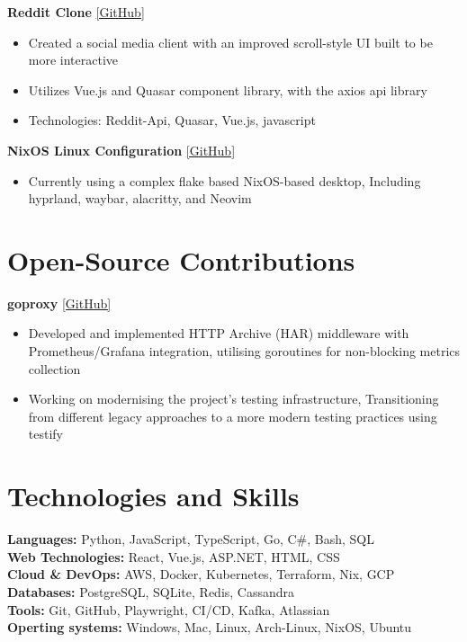 \documentclass[10pt,a4paper]{article}
\begin{document}
	\textbf{Reddit Clone} \href{https://github.com/CameronBadman/Reddit-Clone}{[GitHub]}
	\begin{itemize}[label=\textbullet, itemsep=0.05cm]
		\item Created a social media client with an improved scroll-style UI built to be more interactive
		\item Utilizes Vue.js and Quasar component library, with the axios api library
		\item Technologies: Reddit-Api, Quasar, Vue.js, javascript
	\end{itemize}
	
	\textbf{NixOS Linux Configuration} \href{https://github.com/CameronBadman/nvim-config}{[GitHub]}
	\begin{itemize}[label=\textbullet, itemsep=0.05cm]
		\item Currently using a complex flake based NixOS-based desktop, Including hyprland, waybar, alacritty, and Neovim
	\end{itemize}
	
	\section{Open-Source Contributions}
	\textbf{goproxy} \href{https://github.com/elazarl/goproxy}{[GitHub]}
	\begin{itemize}[label=\textbullet, itemsep=0.05cm]
		\item Developed and implemented HTTP Archive (HAR) middleware with Prometheus/Grafana integration, utilising goroutines for non-blocking metrics collection
		\item Working on modernising the project's testing infrastructure, Transitioning from different legacy approaches to a more modern testing practices using testify
	\end{itemize}
	
	\section{Technologies and Skills}
	\textbf{Languages:} Python, JavaScript, TypeScript, Go, C\#, Bash, SQL \\
	\hspace*{0.5cm}\textbf{Web Technologies:} React, Vue.js, ASP.NET, HTML, CSS \\
	\hspace*{0.5cm}\textbf{Cloud \& DevOps:} AWS, Docker, Kubernetes, Terraform, Nix, GCP \\
	\hspace*{0.5cm}\textbf{Databases:} PostgreSQL, SQLite, Redis, Cassandra \\
	\hspace*{0.5cm}\textbf{Tools:} Git, GitHub, Playwright, CI/CD, Kafka, Atlassian \\
	\hspace*{0.5cm}\textbf{Operting systems:} Windows, Mac, Linux, Arch-Linux, NixOS, Ubuntu
	
\end{document}
